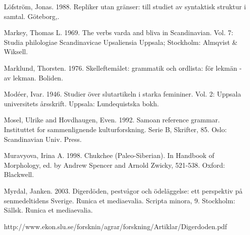 \begin{styleBodytextC}
Löfström, Jonas. 1988. Repliker utan gränser: till studiet av syntaktisk struktur i samtal. Göteborg,.

\end{styleBodytextC}

\begin{styleBodytextC}
Markey, Thomas L. 1969. The verbs varda and bliva in Scandinavian. Vol. 7: Studia philologiae Scandinavicae Upsaliensia Uppsala; Stockholm: Almqvist \& Wiksell.

\end{styleBodytextC}

\begin{styleBodytextC}
Marklund, Thorsten. 1976. Skelleftemålet: grammatik och ordlista: för lekmän - av lekman. Boliden.

\end{styleBodytextC}

\begin{styleBodytextC}
Modéer, Ivar. 1946. Studier över slutartikeln i starka femininer. Vol. 2: Uppsala universitets årsskrift. Uppsala: Lundequistska bokh.

\end{styleBodytextC}

\begin{styleBodytextC}
Mosel, Ulrike and Hovdhaugen, Even. 1992. Samoan reference grammar. Instituttet for sammenlignende kulturforskning. Serie B, Skrifter, 85. Oslo: Scandinavian Univ. Press.

\end{styleBodytextC}

\begin{styleBodytextC}
Muravyova, Irina A. 1998. Chukchee (Paleo-Siberian). In Handbook of Morphology, ed. by Andrew Spencer and Arnold Zwicky, 521-538. Oxford: Blackwell.

\end{styleBodytextC}

\begin{styleBodytextC}
Myrdal, Janken. 2003. Digerdöden, pestvågor och ödeläggelse: ett perspektiv på senmedeltidens Sverige. Runica et mediaevalia. Scripta minora, 9. Stockholm: Sällsk. Runica et mediaevalia. 

\end{styleBodytextC}

\begin{styleBodytextC}
http://www.ekon.slu.se/forsknin/agrar/forskning/Artiklar/Digerdoden.pdf 

\end{styleBodytextC}

